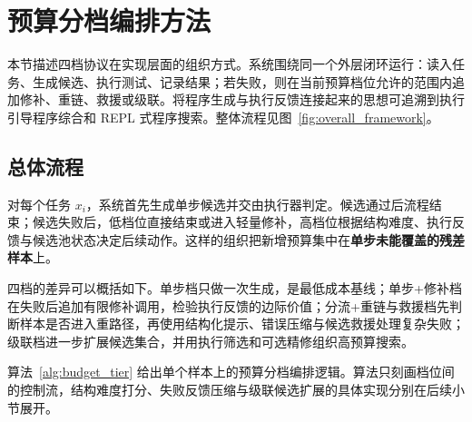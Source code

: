 \section{预算分档编排方法}
\label{sec:method}

本节描述四档协议在实现层面的组织方式。系统围绕同一个外层闭环运行：读入任务、生成候选、执行测试、记录结果；若失败，则在当前预算档位允许的范围内追加修补、重链、救援或级联。将程序生成与执行反馈连接起来的思想可追溯到执行引导程序综合和 REPL 式程序搜索\cite{chen2019execution,ellis2019write}。整体流程见图~\ref{fig:overall_framework}。



\subsection{总体流程}
\label{sec:overview-flow}

对每个任务 $x_i$，系统首先生成单步候选并交由执行器判定。候选通过后流程结束；候选失败后，低档位直接结束或进入轻量修补，高档位根据结构难度、执行反馈与候选池状态决定后续动作。这样的组织把新增预算集中在\textbf{单步未能覆盖的残差样本}上。

四档的差异可以概括如下。单步档只做一次生成，是最低成本基线；单步+修补档在失败后追加有限修补调用，检验执行反馈的边际价值；分流+重链与救援档先判断样本是否进入重路径，再使用结构化提示、错误压缩与候选救援处理复杂失败；级联档进一步扩展候选集合，并用执行筛选和可选精修组织高预算搜索。

算法~\ref{alg:budget_tier} 给出单个样本上的预算分档编排逻辑。算法只刻画档位间的控制流，结构难度打分、失败反馈压缩与级联候选扩展的具体实现分别在后续小节展开。

